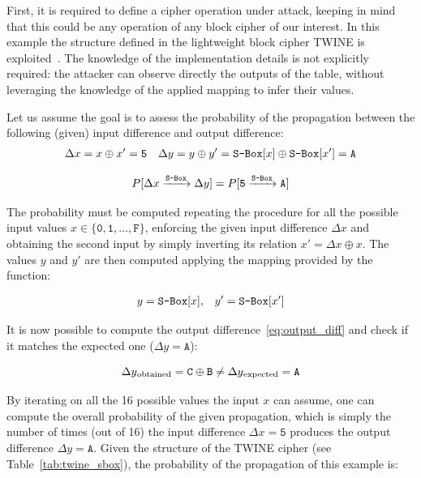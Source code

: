                 First, it is required to define a cipher operation under attack, keeping in mind that this could be any operation of any block cipher of our interest. In this example the \sbocs{} structure defined in the lightweight block cipher TWINE is exploited~\cite{suzaki2012twine}. The knowledge of the implementation details is not explicitly required: the attacker can observe directly the outputs of the \sbocs{} table, without leveraging the knowledge of the applied mapping to infer their values.

                Let us assume the goal is to assess the probability of the propagation between the following (given) input difference and output difference:
                \begin{align}\label{eq:iodifference_example}
                        \Delta x = x \oplus x' = \texttt{5} && \Delta y = y \oplus y' = \texttt{S-Box}{}[x] \oplus \texttt{S-Box}{}[x'] = \texttt{A}
                \end{align}

                \begin{equation}
                    P[\Delta x \xrightarrow[]{\texttt{S-Box}{}} \Delta y] = P[\texttt{5} \xrightarrow[]{\texttt{S-Box}{}} \texttt{A}]
                \end{equation}

                The probability must be computed repeating the procedure for all the possible input values $x \in \{ \texttt{0}, \texttt{1}, \dots, \texttt{F} \}$, enforcing the given input difference $\Delta x$ and obtaining the second input by simply inverting its relation $x' = \Delta x \oplus x$. The values $y$ and $y'$ are then computed applying the mapping provided by the \sbocs{} function:

                \begin{align}
                    y = \texttt{S-Box}{}[x], && y' = \texttt{S-Box}{}[x']
                \end{align}

                It is now possible to compute the output difference~\ref{eq:output_diff} and check if it matches the expected one ($\Delta y = \texttt{A}$):

                \begin{equation}
                    \Delta y \textsubscript{obtained} = \texttt{C} \oplus \texttt{B} \neq \Delta y \textsubscript{expected} = \texttt{A}
                \end{equation}

                By iterating on all the 16 possible values the input $x$ can assume, one can compute the overall probability of the given propagation, which is simply the number of times (out of 16) the input difference $\Delta x = \texttt{5}$ produces the output difference $\Delta y = \texttt{A}$.
                Given the \sbocs{} structure of the TWINE cipher (see Table~\ref{tab:twine_sbox}), the probability of the propagation of this example is:

